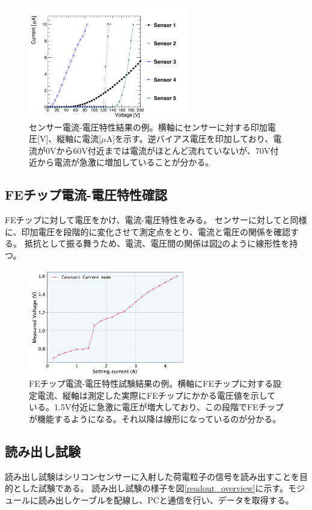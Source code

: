 \begin{figure}[bpt]\centering
\includegraphics[width=7cm]{sensor_IV_result}
\caption[センサー電流-電圧特性結果の例]{センサー電流-電圧特性結果の例\cite{3-4}。横軸にセンサーに対する印加電圧[V]、縦軸に電流[$\mu$A]を示す。逆バイアス電圧を印加しており、電流が0Vから60V付近までは電流がほとんど流れていないが、70V付近から電流が急激に増加していることが分かる。}
\label{sensor_IV_result}
\end{figure}

\subsection{FEチップ電流-電圧特性確認}
FEチップに対して電圧をかけ、電流-電圧特性をみる。
センサーに対してと同様に、印加電圧を段階的に変化させて測定点をとり、電流と電圧の関係を確認する。
抵抗として振る舞うため、電流、電圧間の関係は図\ref{SLDO_VI_result}のように線形性を持つ。

\begin{figure}[bpt]\centering
\includegraphics[width=7cm]{SLDO_VI_result}
\caption[FEチップ電流-電圧特性試験結果の例。]{FEチップ電流-電圧特性試験結果の例\cite{3-4}。横軸にFEチップに対する設定電流、縦軸は測定した実際にFEチップにかかる電圧値を示している。1.5V付近に急激に電圧が増大しており、この段階でFEチップが機能するようになる。それ以降は線形になっているのが分かる。}
\label{SLDO_VI_result}
\end{figure}

\clearpage
\subsection{読み出し試験}
読み出し試験はシリコンセンサーに入射した荷電粒子の信号を読み出すことを目的とした試験である。
読み出し試験の様子を図\ref{readout_overview}に示す。モジュールに読み出しケーブルを配線し、PCと通信を行い、データを取得する。

